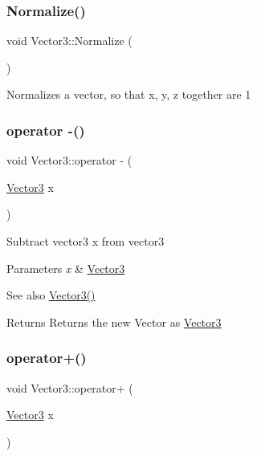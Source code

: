 \subsubsection{\texorpdfstring{Normalize()}{Normalize()}}
{\footnotesize\ttfamily void Vector3\+::\+Normalize (\begin{DoxyParamCaption}{ }\end{DoxyParamCaption})\hspace{0.3cm}{\ttfamily [inline]}}

Normalizes a vector, so that x, y, z together are 1 \mbox{\label{struct_vector3_aa3d4507c8c4a280d49919f1944999406}} 
\subsubsection{\texorpdfstring{operator -\/()}{operator -()}}
{\footnotesize\ttfamily void Vector3\+::operator -\/ (\begin{DoxyParamCaption}\item[{\mbox{\hyperlink{struct_vector3}{Vector3}}}]{x }\end{DoxyParamCaption})\hspace{0.3cm}{\ttfamily [inline]}}

Subtract vector3 x from vector3 
\begin{DoxyParams}{Parameters}
{\em x} & \mbox{\hyperlink{struct_vector3}{Vector3}} \\
\hline
\end{DoxyParams}
\begin{DoxySeeAlso}{See also}
\mbox{\hyperlink{struct_vector3_a0f49191f7e001e7f7ae1cb49522118b4}{Vector3()}} 
\end{DoxySeeAlso}
\begin{DoxyReturn}{Returns}
Returns the new Vector as \mbox{\hyperlink{struct_vector3}{Vector3}} 
\end{DoxyReturn}
\mbox{\label{struct_vector3_a52897becbe532cb731a0117affac5ebe}} 
\subsubsection{\texorpdfstring{operator+()}{operator+()}}
{\footnotesize\ttfamily void Vector3\+::operator+ (\begin{DoxyParamCaption}\item[{\mbox{\hyperlink{struct_vector3}{Vector3}}}]{x }\end{DoxyParamCaption})\hspace{0.3cm}{\ttfamily [inline]}}

